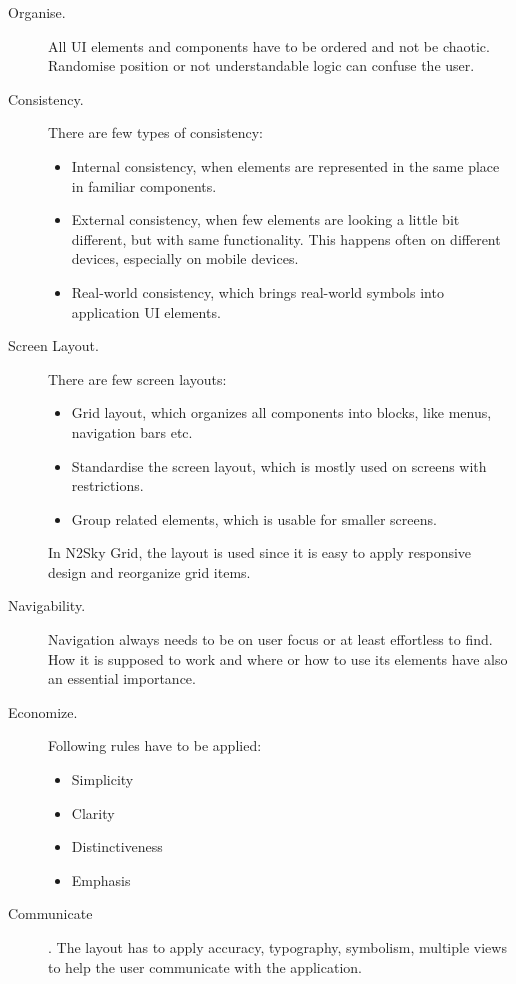 \begin{description}
\item[Organise.]  All UI elements and components have to be ordered and not be chaotic. Randomise position or not understandable logic can confuse the user. 
\item[Consistency.] There are few types of consistency:
\begin{itemize}
\item Internal consistency, when elements are represented in the same place in familiar components. 
\item External consistency, when few elements are looking a little bit different, but with same functionality. This happens often on different devices, especially on mobile devices.
\item Real-world consistency, which brings real-world symbols into application UI elements.
\end{itemize}
\item[Screen Layout.] There are few screen layouts: 
\begin{itemize}
\item Grid layout, which organizes all components into blocks, like menus, navigation bars etc. 
\item Standardise the screen layout, which is mostly used on screens with restrictions.
\item Group related elements, which is usable for smaller screens.
\end{itemize}

In N2Sky Grid, the layout is used since it is easy to apply responsive design and reorganize grid items. 

\item[Navigability.] Navigation always needs to be on user focus or at least effortless to find. How it is supposed to work and where or how to use its elements have also an essential importance.
\item[Economize.] Following rules have to be applied: 
\begin{itemize}
\item Simplicity
\item Clarity
\item Distinctiveness
\item Emphasis
\end{itemize}
\item[Communicate]. The layout has to apply accuracy, typography, symbolism, multiple views to help the user communicate with the application.
\end{description}

